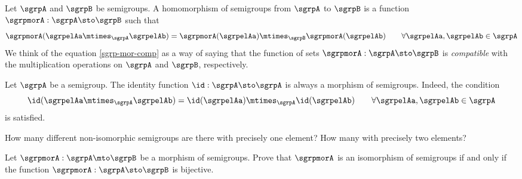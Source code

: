 \begin{definition}
  \label{def:semigroup-mor}
Let $\sgrpA$ and $\sgrpB$ be semigroups. A homomorphism of semigroups from $\sgrpA$ to $\sgrpB$ is a function $\sgrpmorA: \sgrpA \sto \sgrpB$ such that
\begin{equation}\label{sgrp-mor-comp}
\sgrpmorA(\sgrpelAa \mtimes_{\sgrpA} \sgrpelAb) = \sgrpmorA (\sgrpelAa) \mtimes_{\sgrpB} \sgrpmorA(\sgrpelAb) \quad \quad \forall \sgrpelAa, \sgrpelAb \in \sgrpA
\end{equation}
We think of the equation \cref{sgrp-mor-comp} as a way of saying that the function of sets $\sgrpmorA: \sgrpA \sto \sgrpB$  is \emph{compatible} with the multiplication operations on $\sgrpA$ and $\sgrpB$, respectively. 
\end{definition}



\begin{remark}
  \label{def:semigroup-mor}
Let $\sgrpA$ be a semigroup. The identity function $\id: \sgrpA \sto \sgrpA$ is always a morphism of semigroups. Indeed, the condition
\begin{equation}\label{sgrp-mor-comp}
\id (\sgrpelAa \mtimes_{\sgrpA} \sgrpelAb) = \id (\sgrpelAa) \mtimes_{\sgrpA} \id(\sgrpelAb) \quad \quad \forall \sgrpelAa, \sgrpelAb \in \sgrpA
\end{equation}
is satisfied. 
\end{remark}

\begin{exercise}
How many different non-isomorphic semigroups are there with precisely one element? How many with precisely two elements?
\end{exercise}

\begin{exercise}
Let $\sgrpmorA: \sgrpA \mto \sgrpB$ be a morphism of semigroups. Prove that $\sgrpmorA$ is an isomorphism of semigroups if and only if the function $\sgrpmorA: \sgrpA \sto \sgrpB$ is bijective. 
\end{exercise}




